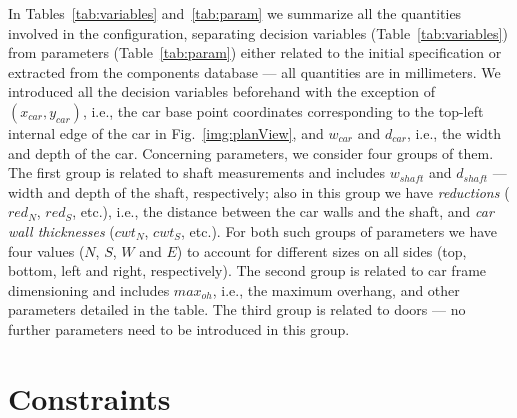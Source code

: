 In Tables~\ref{tab:variables} and~\ref{tab:param} we summarize all 
the quantities involved in 
the configuration, separating decision variables (Table~\ref{tab:variables}) 
from parameters (Table~\ref{tab:param}) either related to the initial specification 
or extracted from the components database --- all quantities are in
millimeters. We introduced all the decision variables beforehand
with the exception of $(x_{car}, y_{car})$, i.e., the car base point
coordinates corresponding to the top-left internal edge of the car in
Fig.~\ref{img:planView}, and $w_{car}$ and $d_{car}$,
i.e., the width and depth of the car.
Concerning parameters, we consider four groups of them. The first group is 
related to shaft measurements and includes $w_{shaft}$ and $d_{shaft}$
--- width and depth of the shaft, respectively; also in this group
we have \emph{reductions} ($red_N$, $red_S$, etc.), i.e., the distance
between the car walls and the shaft, and \emph{car wall thicknesses}
($cwt_N$, $cwt_S$, etc.). For both such groups of parameters we have
four values  
($N$, $S$, $W$ and $E$) to account for different sizes on all
sides (top, bottom, left and right, respectively). The second group is
related to car frame dimensioning and includes $max_{oh}$, i.e., the
maximum overhang, and other parameters detailed in the table. The 
third group is related to doors --- no further parameters need to be
introduced in this group.  

\section{Constraints}
\label{sec:model_constraints}


